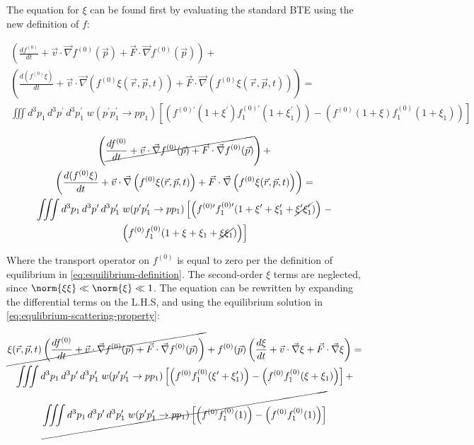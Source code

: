 \documentclass{template}
\begin{document}
The equation for $\xi$ can be found first by evaluating the standard BTE using the new definition of $f$:

\begin{multline}
       \left(  \frac{df^{(0)}}{dt}   + \vec{v}\cdot\vec{\nabla} f^{(0)}(\vec{p})     + \vec{F}\cdot\vec{\nabla}  f^{(0)}(\vec{p})     \right)+\\
    \left(  \frac{d(f^{(0)}\xi)}{dt}   +   \vec{v}\cdot\vec{\nabla} \left(f^{(0)} \xi(\vec{r}, \vec{p}, t) \right)   + \vec{F}\cdot\vec{\nabla}  \left(f^{(0)} \xi(\vec{r}, \vec{p}, t) \right)    \right) = \\
    \iiint  d^3p_1\, d^3p^\prime \, d^3p_1^\prime \; w(p^\prime p_1^\prime \rightarrow pp_1 ) \left[\left(    f^{(0)\prime}(1+\xi^\prime) f^{(0)\prime}_1(1+\xi^\prime_1)\right)   -   \left( f^{(0)}(1+\xi ) f^{(0)}_1(1+\xi_1)\right)\right]
\end{multline}

\begin{multline}
       \left( \cancel{ \frac{df^{(0)}}{dt}   +  \vec{v}\cdot\vec{\nabla} f^{(0)}(\vec{p})     + \vec{F}\cdot\vec{\nabla}  f^{(0)}(\vec{p})  }   \right)+\\
    \left(  \frac{d(f^{(0)}\xi)}{dt}   +   \vec{v}\cdot\vec{\nabla} \left(f^{(0)} \xi(\vec{r}, \vec{p}, t) \right)   + \vec{F}\cdot\vec{\nabla}  \left(f^{(0)} \xi(\vec{r}, \vec{p}, t) \right)    \right) = \\
    \iiint  d^3p_1\, d^3p^\prime \, d^3p_1^\prime \; w(p^\prime p_1^\prime \rightarrow pp_1 ) \left[\left(    f^{(0)\prime}f^{(0)\prime}_1(1+\xi^\prime + \xi^\prime_1 + \cancel{\xi^\prime\xi^\prime_1}) \right) \right.- \\
    \left. \left( f^{(0)}f^{(0)}_1(1+\xi + \xi_1 + \cancel{\xi\xi_1})\right)\right]
\end{multline}

Where the transport operator on $f^{(0)}$ is equal to zero per the definition of equilibrium in \autoref{eq:equilibrium-definition}. The second-order $\xi$ terms are neglected, since $\norm{\xi\xi}\ll\norm{\xi}\ll1$. The equation can be rewritten by expanding the differential terms on the L.H.S, and using the equilibrium solution in \autoref{eq:equlibrium-scattering-property}:

\begin{multline}
      \cancel{ \xi(\vec{r}, \vec{p}, t)\left(  \frac{df^{(0)}}{dt}   +   \vec{v}\cdot\vec{\nabla} f^{(0)}(\vec{p})     + \vec{F}\cdot\vec{\nabla}  f^{(0)}(\vec{p})     \right)}+
        f^{(0)}(\vec{p})\left(  \frac{d\xi}{dt}   +   \vec{v}\cdot\vec{\nabla} \xi     + \vec{F}\cdot\vec{\nabla}  \xi     \right) = \\
    \iiint  d^3p_1\, d^3p^\prime \, d^3p_1^\prime \; w(p^\prime p_1^\prime \rightarrow pp_1 ) \left[\left(    f^{(0)}f^{(0)}_1(\xi^\prime + \xi^\prime_1 ) \right)   -   \left( f^{(0)}f^{(0)}_1(\xi + \xi_1 )\right)\right] + \\
    \cancel{\iiint  d^3p_1\, d^3p^\prime \, d^3p_1^\prime \; w(p^\prime p_1^\prime \rightarrow pp_1 ) \left[\left(    f^{(0)}f^{(0)}_1(1 ) \right)   -   \left( f^{(0)}f^{(0)}_1(1)\right)\right]}
\end{multline}
\end{document}

